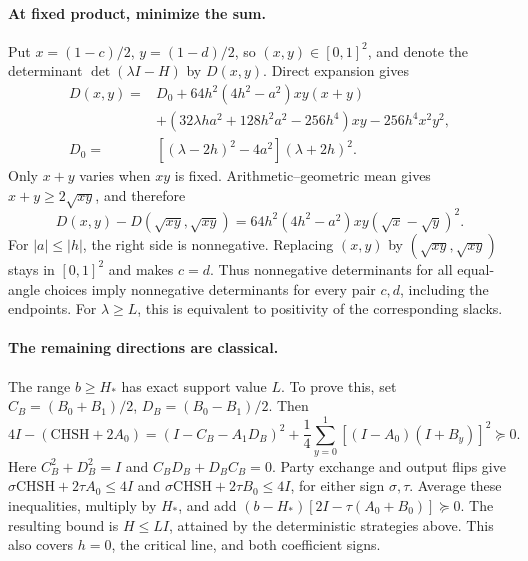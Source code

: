 \documentclass[11pt]{article}
\theoremstyle{remark}\newtheorem{remark}[theorem]{Remark}
\begin{document}
\paragraph{At fixed product, minimize the sum.}
Put \(x=(1-c)/2\), \(y=(1-d)/2\), so $(x,y)\in[0,1]^2$, and denote
the determinant $\det(\lambda I-H)$ by \(D(x,y)\).
Direct expansion gives
\begin{align*}
D(x,y)={}&D_0+64h^2(4h^2-a^2)xy(x+y)\\
 &+(32\lambda ha^2+128h^2a^2-256h^4)xy-256h^4x^2y^2,\\
D_0={}&[(\lambda-2h)^2-4a^2](\lambda+2h)^2.
\end{align*}
Only \(x+y\) varies when \(xy\) is fixed. Arithmetic--geometric mean gives
\(x+y\ge2\sqrt{xy}\), and therefore
\begin{equation}
 D(x,y)-D(\sqrt{xy},\sqrt{xy})
 =64h^2(4h^2-a^2)xy(\sqrt x-\sqrt y)^2 .
 \label{eq:diagonal}
\end{equation}
For \(|a|\le |h|\), the right side is nonnegative. Replacing $(x,y)$ by
$(\sqrt{xy},\sqrt{xy})$ stays in $[0,1]^2$ and makes $c=d$.
Thus nonnegative determinants for all equal-angle choices imply nonnegative
determinants for every pair \(c,d\), including the endpoints. For
$\lambda\ge L$, this is equivalent to positivity of the corresponding slacks.

\paragraph{The remaining directions are classical.}
The range \(b\ge H_*\) has exact support value \(L\).
To prove this, set \(C_B=(B_0+B_1)/2\), \(D_B=(B_0-B_1)/2\). Then
\begin{equation}
 4I-(\mathrm{CHSH}+2A_0)
 =(I-C_B-A_1D_B)^2+
 \frac14\sum_{y=0}^1[(I-A_0)(I+B_y)]^2\succeq0 .
 \label{eq:critical}
\end{equation}
Here \(C_B^2+D_B^2=I\) and \(C_BD_B+D_BC_B=0\).
Party exchange and output flips give
\(\sigma\mathrm{CHSH}+2\tau A_0\le4I\) and
\(\sigma\mathrm{CHSH}+2\tau B_0\le4I\), for either sign \(\sigma,\tau\).
Average these inequalities, multiply by \(H_*\), and add
\((b-H_*)[2I-\tau(A_0+B_0)]\succeq0\).
The resulting bound is \(H\le LI\), attained by the deterministic strategies above.
This also covers \(h=0\), the critical line, and both coefficient signs.
\end{document}
